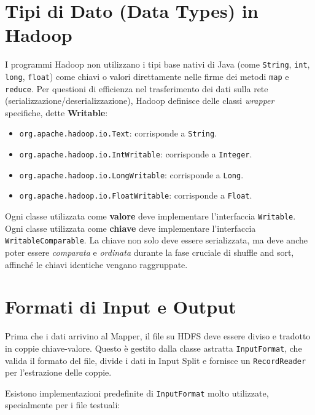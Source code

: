 \section{Tipi di Dato (Data Types) in Hadoop}

I programmi Hadoop non utilizzano i tipi base nativi di Java (come \texttt{String}, \texttt{int}, \texttt{long}, \texttt{float}) come chiavi o valori direttamente nelle firme dei metodi \texttt{map} e \texttt{reduce}. Per questioni di efficienza nel trasferimento dei dati sulla rete (serializzazione/deserializzazione), Hadoop definisce delle classi \textit{wrapper} specifiche, dette \textbf{Writable}:
\begin{itemize}
    \item \texttt{org.apache.hadoop.io.Text}: corrisponde a \texttt{String}.
    \item \texttt{org.apache.hadoop.io.IntWritable}: corrisponde a \texttt{Integer}.
    \item \texttt{org.apache.hadoop.io.LongWritable}: corrisponde a \texttt{Long}.
    \item \texttt{org.apache.hadoop.io.FloatWritable}: corrisponde a \texttt{Float}.
\end{itemize}

Ogni classe utilizzata come \textbf{valore} deve implementare l'interfaccia \texttt{Writable}.
Ogni classe utilizzata come \textbf{chiave} deve implementare l'interfaccia \texttt{WritableComparable}. La chiave non solo deve essere serializzata, ma deve anche poter essere \textit{comparata} e \textit{ordinata} durante la fase cruciale di shuffle and sort, affinché le chiavi identiche vengano raggruppate.

\section{Formati di Input e Output}

Prima che i dati arrivino al Mapper, il file su HDFS deve essere diviso e tradotto in coppie chiave-valore. Questo è gestito dalla classe astratta \texttt{InputFormat}, che valida il formato del file, divide i dati in Input Split e fornisce un \texttt{RecordReader} per l'estrazione delle coppie.

Esistono implementazioni predefinite di \texttt{InputFormat} molto utilizzate, specialmente per i file testuali:

